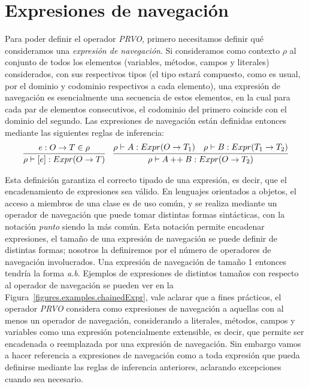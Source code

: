 \section{Expresiones de navegaci\'on}
\label{sec:prvo.navigationalExpressions}

Para poder definir el operador \emph{PRVO}, primero necesitamos definir qu\'e consideramos una \emph{expresi\'on de navegaci\'on}. Si consideramos como contexto $\rho$ al conjunto de todos los elementos (variables, m\'etodos, campos y literales) considerados, con sus respectivos tipos (el tipo estar\'a compuesto, como es usual, por el dominio y codominio respectivos a cada elemento), una expresi\'on de navegaci\'on es esencialmente una secuencia de estos elementos, en la cual para cada par de elementos consecutivos, el codominio del primero coincide con el dominio del segundo. Las expresiones de navegaci\'on est\'an definidas entonces mediante las siguientes reglas de inferencia:
\begin{displaymath}
\begin{array}{cc}
	\infer{\rho \vdash [e] : Expr(O \rightarrow T)}{
		e : O \rightarrow T \in \rho
	}
	&\infer{\rho \vdash A \:\textrm{++}\: B : Expr(O \rightarrow T_2)}{
		{\rho \vdash A : Expr(O \rightarrow T_1)}
		& {\rho \vdash B : Expr(T_1 \rightarrow T_2)}
	}
\end{array}
\end{displaymath}

Esta definici\'on garantiza el correcto tipado de una expresi\'on, es decir, que el encadenamiento de expresiones sea v\'alido. En lenguajes orientados a objetos, el acceso a miembros de una clase es de uso com\'un, y se realiza mediante un operador de navegaci\'on que puede tomar distintas formas sint\'acticas, con la notaci\'on \emph{punto} siendo la m\'as com\'un. Esta notaci\'on permite encadenar expresiones, el tama\~no de una expresi\'on de navegaci\'on se puede definir de distintas formas; nosotros la definiremos por el n\'umero de operadores de navegaci\'on involucrados. Una expresi\'on de navegaci\'on de tama\~no 1 entonces tendr\'ia la forma \emph{a.b}. Ejemplos de expresiones de distintos tama\~nos con respecto al operador de navegaci\'on se pueden ver en la Figura~\ref{figures.examples.chainedExpr}, vale aclarar que a fines pr\'acticos, el operador \emph{PRVO} considera como expresiones de navegaci\'on a aquellas con al menos un operador de navegaci\'on, considerando a literales, m\'etodos, campos y variables como una expresi\'on potencialmente extensible, es decir, que permite ser encadenada o reemplazada por una expresi\'on de navegaci\'on. Sin embargo vamos a hacer referencia a expresiones de navegaci\'on como a toda expresi\'on que pueda definirse mediante las reglas de inferencia anteriores, aclarando excepciones cuando sea necesario.

